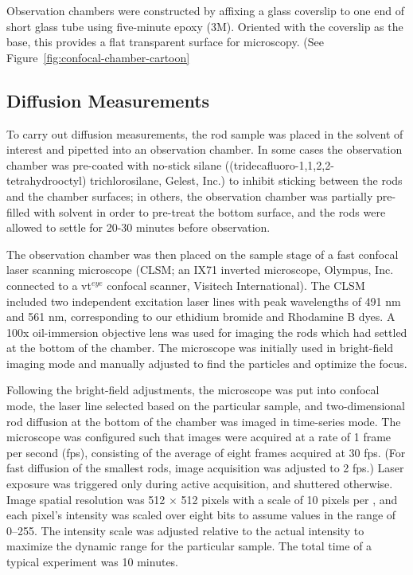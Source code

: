 

Observation chambers were constructed by affixing a glass coverslip to one end of short glass tube using 
five-minute epoxy (3M).  Oriented with the coverslip as the base, this provides a flat transparent surface
for microscopy. (See Figure~\ref{fig:confocal-chamber-cartoon}


\subsection{Diffusion Measurements}
\label{sec:exp-diffusion}

To carry out diffusion measurements, the rod sample was placed in the solvent of interest and pipetted into an observation 
chamber.  In some cases the observation chamber was pre-coated with no-stick silane ((tridecafluoro-1,1,2,2-tetrahydrooctyl) 
trichlorosilane, Gelest, Inc.) to inhibit sticking between the rods and the chamber surfaces; in others,
the observation chamber was partially pre-filled with solvent in order to pre-treat the 
bottom surface, and the rods were allowed to settle for 20-30 minutes before observation.

The observation chamber was then placed on the sample stage of a fast confocal laser scanning microscope (CLSM; 
an IX71 inverted microscope, Olympus, Inc. connected to a vt$^{eye}$ confocal scanner, Visitech International). The CLSM
included two independent excitation laser lines with peak wavelengths of 491 nm and 561 nm, corresponding to our ethidium 
bromide and Rhodamine B dyes.  A 100x oil-immersion objective lens was used for imaging the rods which had settled at the bottom
of the chamber.  The microscope was initially used in bright-field imaging mode and manually adjusted to find the particles and 
optimize the focus.

Following the bright-field adjustments, the microscope was put into confocal mode, the laser line selected 
based on the particular sample, and two-dimensional rod diffusion at the 
bottom of the chamber was imaged in time-series mode.  The microscope was configured such that images were acquired at
a rate of 1 frame per second (fps), consisting of the average of eight frames acquired at 30 fps.  
(For fast diffusion of the smallest rods,
image acquisition was adjusted to 2 fps.)  Laser exposure was triggered only during active 
acquisition, and shuttered otherwise.  Image spatial resolution was 512 $\times$ 512 pixels with a scale of 10 pixels
per \microns, and each pixel's intensity was scaled over eight bits to assume values in the range of 0--255.
The intensity scale was adjusted relative to the actual intensity to maximize the dynamic range for the particular sample.
The total time of a typical experiment was 10 minutes.

